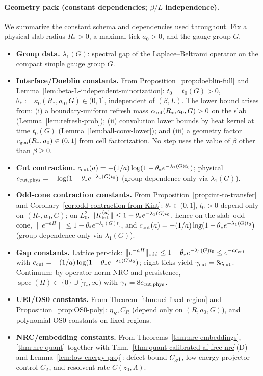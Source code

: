 \documentclass[11pt]{amsart}
\theoremstyle{plain}
\theoremstyle{definition}
\theoremstyle{remark}
\begin{document}
\paragraph{Geometry pack (constant dependencies; $\beta/L$ independence).}\label{para:geometry-pack}
We summarize the constant schema and dependencies used throughout. Fix a physical slab radius $R_*>0$, a maximal tick $a_0>0$, and the gauge group $G$.
\begin{itemize}
  \item \textbf{Group data.} $\lambda_1(G)$: spectral gap of the Laplace--Beltrami operator on the compact simple gauge group $G$.
  \item \textbf{Interface/Doeblin constants.} From Proposition~\ref{prop:doeblin-full} and Lemma~\ref{lem:beta-L-independent-minorization}:
  $t_0=t_0(G)>0$, $\theta_*:=\kappa_0(R_*,a_0,G)\in(0,1]$, independent of $(\beta,L)$. The lower bound arises from: (i) a boundary-uniform refresh mass $\alpha_{\rm ref}(R_*,a_0,G)>0$ on the slab (Lemma~\ref{lem:refresh-prob}); (ii) convolution lower bounds by heat kernel at time $t_0(G)$ (Lemma~\ref{lem:ball-conv-lower}); and (iii) a geometry factor $c_{\rm geo}(R_*,a_0)\in(0,1]$ from cell factorization. No step uses the value of $\beta$ other than $\beta\ge 0$.
  \item \textbf{Cut contraction.} $c_{\rm cut}(a)=-(1/a)\log(1-\theta_* e^{-\lambda_1(G) t_0})$; physical $c_{\rm cut,phys}=-\log(1-\theta_* e^{-\lambda_1(G) t_0})$ (group dependence only via $\lambda_1(G)$).
  \item \textbf{Odd-cone contraction constants.} From Proposition~\ref{prop:int-to-transfer} and Corollary~\ref{cor:odd-contraction-from-Kint}:
  $\theta_*\in(0,1]$, $t_0>0$ depend only on $(R_*,a_0,G)$; on $L^2_0$,
  $\|K_{\rm int}^{(a)}\|\le 1-\theta_* e^{-\lambda_1(G) t_0}$, hence on the slab--odd cone, $\|e^{-aH}\|\le 1-\theta_* e^{-\lambda_1(G) t_0}$, and $c_{\rm cut}(a)=-(1/a)\log(1-\theta_* e^{-\lambda_1(G) t_0})$ (group dependence only via $\lambda_1(G)$).
  \item \textbf{Gap constants.} Lattice per-tick: $\|e^{-aH}\|_{\rm odd}\le 1-\theta_* e^{-\lambda_1(G) t_0}\le e^{-a c_{\rm cut}}$ with $c_{\rm cut}=-(1/a)\log(1-\theta_* e^{-\lambda_1(G) t_0})$; eight ticks yield $\gamma_{\rm cut}=8 c_{\rm cut}$. Continuum: by operator-norm NRC and persistence, $\operatorname{spec}(H)\subset\{0\}\cup[\gamma_*,\infty)$ with $\gamma_*=8 c_{\rm cut,phys}$.
  \item \textbf{UEI/OS0 constants.} From Theorem~\ref{thm:uei-fixed-region} and Proposition~\ref{prop:OS0-poly}: $\eta_R, C_R$ (depend only on $(R,a_0,G)$), and polynomial OS0 constants on fixed regions.
  \item \textbf{NRC/embedding constants.} From Theorems~\ref{thm:nrc-embeddings}, \ref{thm:nrc-quant} together with Thm.~\ref{thm:quant-calibrated-af-free-nrc}(D) and Lemma~\ref{lem:low-energy-proj}: defect bound $C_{\rm gd}$, low-energy projector control $C_\Lambda$, and resolvent rate $C(z_0,\Lambda)$.
\end{itemize}
\end{document}
